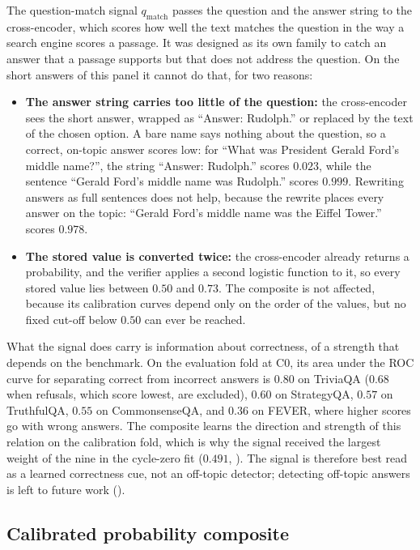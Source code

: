 The question-match signal $q_{\text{match}}$ passes the question and the answer string to the cross-encoder, which scores how well the text matches the question in the way a search engine scores a passage. It was designed as its own family to catch an answer that a passage supports but that does not address the question. On the short answers of this panel it cannot do that, for two reasons:
\begin{itemize}
    \item \textbf{The answer string carries too little of the question:} the cross-encoder sees the short answer, wrapped as ``Answer: Rudolph.'' or replaced by the text of the chosen option. A bare name says nothing about the question, so a correct, on-topic answer scores low: for ``What was President Gerald Ford's middle name?'', the string ``Answer: Rudolph.'' scores $0.023$, while the sentence ``Gerald Ford's middle name was Rudolph.'' scores $0.999$. Rewriting answers as full sentences does not help, because the rewrite places every answer on the topic: ``Gerald Ford's middle name was the Eiffel Tower.'' scores $0.978$.
    \item \textbf{The stored value is converted twice:} the cross-encoder already returns a probability, and the verifier applies a second logistic function to it, so every stored value lies between $0.50$ and $0.73$. The composite is not affected, because its calibration curves depend only on the order of the values, but no fixed cut-off below $0.50$ can ever be reached.
\end{itemize}
What the signal does carry is information about correctness, of a strength that depends on the benchmark. On the evaluation fold at C0, its area under the ROC curve for separating correct from incorrect answers is $0.80$ on TriviaQA ($0.68$ when refusals, which score lowest, are excluded), $0.60$ on StrategyQA, $0.57$ on TruthfulQA, $0.55$ on CommonsenseQA, and $0.36$ on FEVER, where higher scores go with wrong answers. The composite learns the direction and strength of this relation on the calibration fold, which is why the signal received the largest weight of the nine in the cycle-zero fit ($0.491$, ). The signal is therefore best read as a learned correctness cue, not an off-topic detector; detecting off-topic answers is left to future work ().

\subsection{Calibrated probability composite}
\label{sec:composite}

